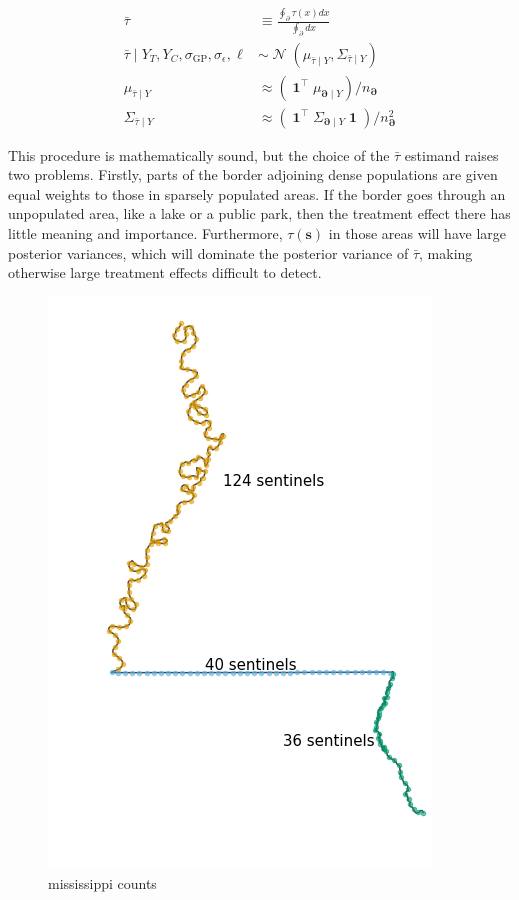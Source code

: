 \documentclass[letter]{article}
\makeatletter
\def\maxwidth{\ifdim\Gin@nat@width>\linewidth\linewidth
    \else\Gin@nat@width\fi}
\let\Oldincludegraphics\includegraphics
\renewcommand{\includegraphics}[1]{\Oldincludegraphics[width=.8\maxwidth]{#1}}
\newcommand{\genericdel}[3]{%
      \left#1#3\right#2
    }
\newcommand{\del}[1]{\genericdel(){#1}}
\DeclareMathOperator{\normal}{\mathcal{N}}
\DeclareMathOperator{\ones}{\mathbf{1}}
\newcommand{\trans}{^{\intercal}}
\newcommand{\sigmaf}{\sigma_{\mathrm{GP}}}
\newcommand{\sigman}{\sigma_{\epsilon}}
\newcommand{\svec}{\mathbold{s}}
\newcommand{\boundary}{\partial}
\newcommand{\sentinels}{\bm{\boundary}}
\newcommand{\linavg}{\bar{\tau}}
\makeatother
\begin{document}
\begin{equation}\begin{split}
    \linavg &\equiv \frac{\oint_\boundary \left. \tau(x) dx \right.}{\oint_\boundary \left. dx \right.} \\
    \linavg \mid Y_T, Y_C, \sigmaf, \sigman, \ell &\sim \normal\del{\mu_{\linavg \mid Y}, \Sigma_{\linavg \mid Y}} \\
    \mu_{\linavg \mid Y} &\approx \del{\ones\trans \mu_{\sentinels \mid Y}} / n_{\sentinels} \\
    \Sigma_{\linavg \mid Y} &\approx \del{\ones\trans \Sigma_{\sentinels \mid Y} \ones} / n_{\sentinels}^2
\end{split}\end{equation}

This procedure is mathematically sound, but the choice of the
\(\linavg\) estimand raises two problems. Firstly, parts of the border
adjoining dense populations are given equal weights to those in sparsely
populated areas. If the border goes through an unpopulated area, like a
lake or a public park, then the treatment effect there has little
meaning and importance. Furthermore, \(\tau(\svec)\) in those areas will
have large posterior variances, which will dominate the posterior
variance of \(\linavg\), making otherwise large treatment effects
difficult to detect.

\begin{figure}
\centering
\includegraphics{figures/mississippi_counts.png}
\caption{mississippi counts}
\end{figure}
\end{document}
